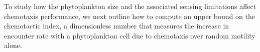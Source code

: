 \documentclass[9pt,twocolumn,twoside]{pnas-new}
\begin{document}
To study how the phytoplankton size and the associated sensing limitations affect chemotaxis performance, we next outline how to compute an upper bound on the chemotactic index, a dimensionless number that measures the increase in encounter rate with a phytoplankton cell due to chemotaxis over random motility alone.
\end{document}
